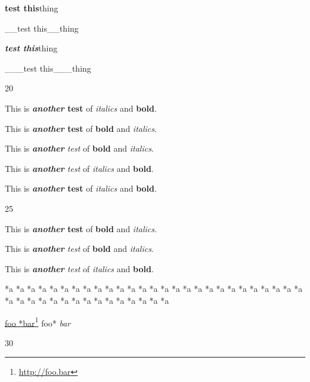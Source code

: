 \textbf{test this}thing

\_\_test this\_\_thing

\textbf{\emph{test this}}thing

\_\_\_test this\_\_\_thing

20

This is \textbf{\emph{another} test} of \emph{italics} and \textbf{bold}.

This is \textbf{\emph{another} test} of \textbf{bold} and \emph{italics}.

This is \emph{\textbf{another} test} of \textbf{bold} and \emph{italics}.

This is \emph{\textbf{another} test} of \emph{italics} and \textbf{bold}.

This is \textbf{\emph{another} test} of \emph{italics} and \textbf{bold}.

25

This is \textbf{\emph{another} test} of \textbf{bold} and \emph{italics}.

This is \emph{\textbf{another} test} of \textbf{bold} and \emph{italics}.

This is \emph{\textbf{another} test} of \emph{italics} and \textbf{bold}.

*a *a *a *a *a *a *a *a *a *a *a *a *a *a *a *a *a *a *a *a *a *a *a *a *a *a *a *a *a *a *a *a *a *a *a *a *a *a *a *a *a *a

\href{http://foo.bar}{foo *bar}\footnote{\href{http://foo.bar}{http:\slash \slash foo.bar}} foo* \emph{bar}

30



